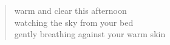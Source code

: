\begin{verse}
warm and clear this afternoon \\
watching the sky from your bed \\
gently breathing against your warm skin
\end{verse}
